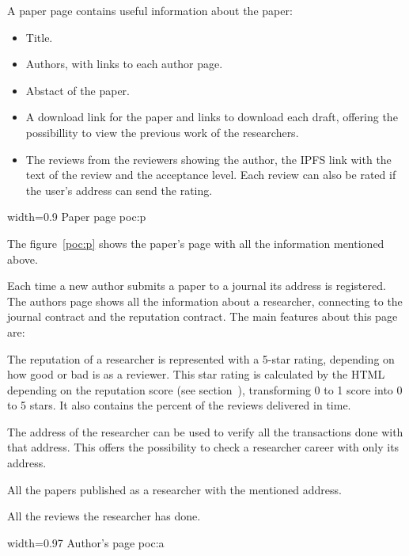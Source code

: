 

A paper page contains useful information about the paper:
\begin{itemize}
\item Title.
\item Authors, with links to each author page.
\item Abstact of the paper.
\item A download link for the paper and links to download each draft, offering
  the possibillity to view the previous work of the researchers.
\item The reviews from the reviewers showing the author, the IPFS link with the text of the review
  and the acceptance level. Each review can also be rated if the user's address
  can send  the rating.
\end{itemize}
%
{width=0.9\linewidth}%
{Paper page}%
{poc:p}

The figure~\ref{poc:p} shows the paper's page with all the information mentioned
above.


Each time a new author submits a paper to a journal its address is registered.
The authors page shows all the information about a researcher, connecting to the
journal contract and the reputation contract. The main features about this page
are:

\begin{itemize}
   The reputation of a researcher is represented with a 5-star
  rating, depending on how good or bad is as a reviewer. This star rating is
  calculated by the HTML depending on the reputation score (see section~),
  transforming 0 to 1 score into 0 to 5 stars. It also contains the percent of
  the reviews delivered in time.

   The address of the researcher can be used to verify
  all the transactions done with that address. This offers the possibility to
  check a researcher career with only its address.

   All the papers published as a researcher with the
  mentioned address.

   All the reviews the researcher has done. 
\end{itemize}

%
{width=0.97\linewidth}%
{Author's page}%
{poc:a}

